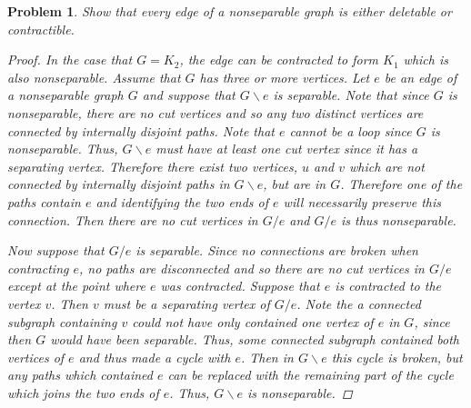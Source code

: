 \documentclass{article}
\newtheorem{problem}{Problem}
\begin{document}
\begin{flushleft}
\begin{problem}
Show that every edge of a nonseparable graph is either deletable or contractible.
\begin{proof}
In the case that $G = K_2$, the edge can be contracted to form $K_1$ which is also nonseparable. Assume that $G$ has three or more vertices. Let $e$ be an edge of a nonseparable graph $G$ and suppose that $G \backslash e$ is separable. Note that since $G$ is nonseparable, there are no cut vertices and so any two distinct vertices are connected by internally disjoint paths. Note that $e$ cannot be a loop since $G$ is nonseparable. Thus, $G \backslash e$ must have at least one cut vertex since it has a separating vertex. Therefore there exist two vertices, $u$ and $v$ which are not connected by internally disjoint paths in $G \backslash e$, but are in $G$. Therefore one of the paths contain $e$ and identifying the two ends of $e$ will necessarily preserve this connection. Then there are no cut vertices in $G / e$ and $G / e$ is thus nonseparable.\newline

Now suppose that $G / e$ is separable. Since no connections are broken when contracting $e$, no paths are disconnected and so there are no cut vertices in $G / e$ except at the point where $e$ was contracted. Suppose that $e$ is contracted to the vertex $v$. Then $v$ must be a separating vertex of $G / e$. Note the a connected subgraph containing $v$ could not have only contained one vertex of $e$ in $G$, since then $G$ would have been separable. Thus, some connected subgraph contained both vertices of $e$ and thus made a cycle with $e$. Then in $G \backslash e$ this cycle is broken, but any paths which contained $e$ can be replaced with the remaining part of the cycle which joins the two ends of $e$. Thus, $G \backslash e$ is nonseparable.
\end{proof}
\end{problem}

\end{flushleft}
\end{document}
